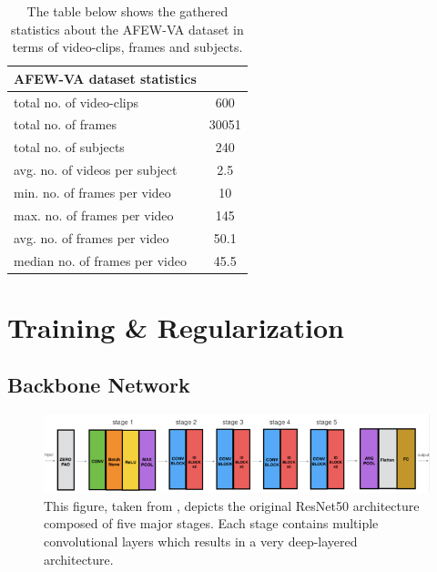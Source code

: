 \begin{table}[H]
\caption[AFEW-VA dataset statistics]{The table below shows the gathered statistics about the AFEW-VA dataset in terms of video-clips, frames and subjects.}
\begin{center}
\begin{tabular}{@{}lc@{}}
\toprule
\textbf{AFEW-VA dataset statistics} &  \\ \midrule
total no. of video-clips & 600 \\
total no. of frames & 30051 \\
total no. of subjects & 240 \\
avg. no. of videos per subject & 2.5 \\
min. no. of frames per video & 10 \\
max. no. of frames per video & 145 \\
avg. no. of frames per video & 50.1 \\
median no. of frames per video & 45.5 \\ \bottomrule
\end{tabular}
\label{tab:DatasetStatistics}
\end{center}
\end{table}

\section{Training \& Regularization}
\subsection{Backbone Network}

\begin{figure}[H]
  \begin{center}
  \includegraphics[angle=0, width=1.0\textwidth]{Figures/resnet50.png}
  \caption[ResNet50 architecture overview]{This figure, taken from \citep{Dwivedi:2019:ResNetInKeras}, depicts the original ResNet50 \citep{He:2015:DeepResidualLearningForImageRecognition} architecture composed of five major stages. Each stage contains multiple convolutional layers which results in a very deep-layered architecture.}
  \label{fig:ResNet50Architecture}
  \end{center}
\end{figure}

